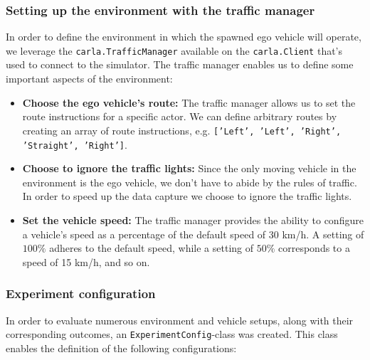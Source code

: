 \subsubsection{Setting up the environment with the traffic manager}

In order to define the environment in which the spawned ego vehicle will operate, we leverage the \texttt{carla.TrafficManager} available on the \texttt{carla.Client} that's used to connect to the simulator. The traffic manager enables us to define some important aspects of the environment:

\begin{itemize}
    \item \textbf{Choose the ego vehicle's route:} The traffic manager allows us to set the route instructions for a specific actor. We can define arbitrary routes by creating an array of route instructions, e.g. \texttt{['Left', 'Left', 'Right', 'Straight', 'Right']}.
    \item \textbf{Choose to ignore the traffic lights:} Since the only moving vehicle in the environment is the ego vehicle, we don't have to abide by the rules of traffic. In order to speed up the data capture we choose to ignore the traffic lights.
    \item \textbf{Set the vehicle speed:} The traffic manager provides the ability to configure a vehicle’s speed as a percentage of the default speed of 30 km/h. A setting of $100\%$ adheres to the default speed, while a setting of $50\%$ corresponds to a speed of 15 km/h, and so on.
\end{itemize}


\subsubsection{Experiment configuration}
In order to evaluate numerous environment and vehicle setups, along with their corresponding outcomes, an \texttt{ExperimentConfig}-class was created. This class enables the definition of the following configurations:

